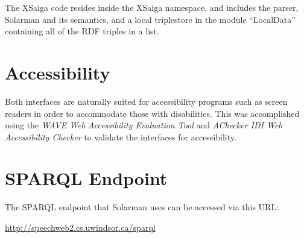 \documentclass[../main.tex]{subfiles}
\begin{document}
The XSaiga code resides inside the XSaiga namespace, and includes the parser, Solarman and its semantics, and a local triplestore in the module ``LocalData'' containing
all of the RDF triples in a list.  

\section{Accessibility}

Both interfaces are naturally suited for accessibility programs such as screen readers in order to accommodate those with disabilities.
This was accomplished using the {\em WAVE Web Accessibility Evaluation Tool} \cite{wave} and {\em AChecker IDI Web Accessibility Checker} \cite{achecker} to validate the interfaces for accessibility.

\section{SPARQL Endpoint}
The SPARQL endpoint that Solarman uses can be accessed via this URL:

\url{http://speechweb2.cs.uwindsor.ca/sparql}
\end{document}
